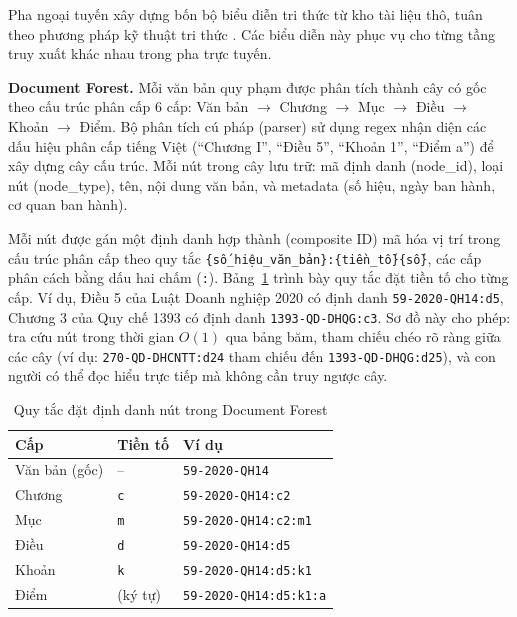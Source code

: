 Pha ngoại tuyến xây dựng bốn bộ biểu diễn tri thức từ kho tài liệu thô, tuân
theo phương pháp kỹ thuật tri thức \cite{sartor2011legalonto}. Các biểu diễn này
phục vụ cho từng tầng truy xuất khác nhau trong pha trực tuyến.

\textbf{Document Forest.}
Mỗi văn bản quy phạm được phân tích thành cây có gốc theo cấu trúc phân cấp
6 cấp: Văn bản $\to$ Chương $\to$ Mục $\to$ Điều $\to$ Khoản $\to$ Điểm. Bộ
phân tích cú pháp (parser) sử dụng regex nhận diện các dấu hiệu phân cấp tiếng
Việt (``Chương I'', ``Điều 5'', ``Khoản 1'', ``Điểm a'') để xây dựng cây cấu
trúc. Mỗi nút trong cây lưu trữ: mã định danh (node\_id), loại nút (node\_type),
tên, nội dung văn bản, và metadata (số hiệu, ngày ban hành, cơ quan ban hành).

Mỗi nút được gán một định danh hợp thành (composite ID) mã hóa vị trí trong cấu
trúc phân cấp theo quy tắc \texttt{\{số\_hiệu\_văn\_bản\}:\{tiền\_tố\}\{số\}}, các cấp phân cách bằng dấu hai chấm (\texttt{:}).
Bảng~\ref{tab:node-identifier-rules} trình bày quy tắc đặt tiền tố cho từng cấp.
Ví dụ, Điều 5 của Luật Doanh nghiệp 2020 có định danh \texttt{59-2020-QH14:d5},
Chương 3 của Quy chế 1393 có định danh \texttt{1393-QD-DHQG:c3}. Sơ đồ này cho
phép: tra cứu nút trong thời gian $O(1)$ qua bảng băm, tham chiếu chéo rõ ràng
giữa các cây (ví dụ: \texttt{270-QD-DHCNTT:d24} tham chiếu đến
\texttt{1393-QD-DHQG:d25}), và con người có thể đọc hiểu trực tiếp mà không cần
truy ngược cây.

\begin{table}[htbp]
  \centering
  \caption{Quy tắc đặt định danh nút trong Document Forest}
  \label{tab:node-identifier-rules}
  \begin{tabular}{lll}
    \toprule
    \textbf{Cấp} & \textbf{Tiền tố} & \textbf{Ví dụ} \\
    \midrule
    Văn bản (gốc) & -- & \texttt{59-2020-QH14} \\
    Chương        & \texttt{c} & \texttt{59-2020-QH14:c2} \\
    Mục           & \texttt{m} & \texttt{59-2020-QH14:c2:m1} \\
    Điều          & \texttt{d} & \texttt{59-2020-QH14:d5} \\
    Khoản         & \texttt{k} & \texttt{59-2020-QH14:d5:k1} \\
    Điểm          & (ký tự) & \texttt{59-2020-QH14:d5:k1:a} \\
    \bottomrule
  \end{tabular}
\end{table}

